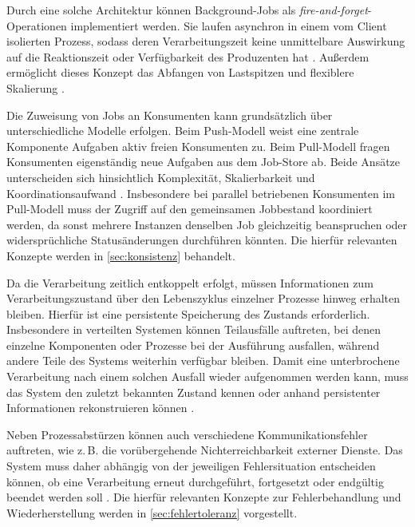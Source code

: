 Durch eine solche Architektur können Background-Jobs als \textit{fire-and-forget}-Operationen implementiert werden.
Sie laufen asynchron in einem vom Client isolierten Prozess, sodass deren Verarbeitungszeit keine unmittelbare Auswirkung
auf die Reaktionszeit oder Verfügbarkeit des Produzenten hat \parencite{microsoft_corporation_hrsg_best_2026}.
Außerdem ermöglicht dieses Konzept das Abfangen von Lastspitzen und flexiblere Skalierung \parencite{microsoft_corporation_hrsg_queue-based_2026}.

Die Zuweisung von Jobs an Konsumenten kann grundsätzlich über unterschiedliche Modelle erfolgen.
Beim Push-Modell weist eine zentrale Komponente Aufgaben aktiv freien Konsumenten zu.
Beim Pull-Modell fragen Konsumenten eigenständig neue Aufgaben aus dem Job-Store ab.
Beide Ansätze unterscheiden sich hinsichtlich Komplexität, Skalierbarkeit und Koordinationsaufwand
\parencite[Kap.~11 Abschnitt \glqq Transmitting Event Streams\grqq]{kleppmann_designing_2017}.
Insbesondere bei parallel betriebenen Konsumenten im Pull-Modell muss der Zugriff auf den gemeinsamen Jobbestand koordiniert
werden, da sonst mehrere Instanzen denselben Job gleichzeitig beanspruchen oder widersprüchliche Statusänderungen durchführen könnten.
Die hierfür relevanten Konzepte werden in \cref{sec:konsistenz} behandelt.

Da die Verarbeitung zeitlich entkoppelt erfolgt, müssen Informationen zum Verarbeitungszustand über den
Lebenszyklus einzelner Prozesse hinweg erhalten bleiben.
Hierfür ist eine persistente Speicherung des Zustands erforderlich.
Insbesondere in verteilten Systemen können Teilausfälle auftreten, bei denen einzelne Komponenten oder Prozesse bei
der Ausführung ausfallen, während andere Teile des Systems weiterhin verfügbar bleiben.
Damit eine unterbrochene Verarbeitung nach einem solchen Ausfall wieder aufgenommen werden kann, muss das System den zuletzt bekannten
Zustand kennen oder anhand persistenter Informationen rekonstruieren können
\parencite[Kap.~11 Abschnitt \glqq Rebuilding state after a failure\grqq]{kleppmann_designing_2017}.

Neben Prozessabstürzen können auch verschiedene Kommunikationsfehler auftreten, wie z.\,B. die vorübergehende Nichterreichbarkeit
externer Dienste.
Das System muss daher abhängig von der jeweiligen Fehlersituation entscheiden können, ob eine Verarbeitung erneut durchgeführt,
fortgesetzt oder endgültig beendet werden soll \parencite{microsoft_corporation_hrsg_best_2026}.
Die hierfür relevanten Konzepte zur Fehlerbehandlung und Wiederherstellung werden in \cref{sec:fehlertoleranz} vorgestellt.

